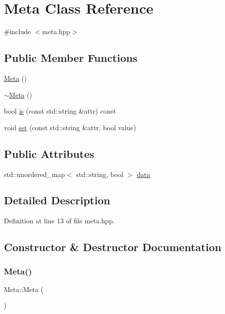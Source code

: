 \hypertarget{class_meta}{}\section{Meta Class Reference}
\label{class_meta}


{\ttfamily \#include $<$meta.\+hpp$>$}

\subsection*{Public Member Functions}
\begin{DoxyCompactItemize}
\item 
\hyperlink{class_meta_a19e6892526dc75960962404a9f7f215b}{Meta} ()
\item 
\hyperlink{class_meta_a6a2199955a1318b54f7d4d2a0e470b36}{$\sim$\+Meta} ()
\item 
bool \hyperlink{class_meta_a935668f7ea11c899be35505093a15415}{is} (const std\+::string \&attr) const
\item 
void \hyperlink{class_meta_a988be331a6084a39edafbeb7c5553ca5}{set} (const std\+::string \&attr, bool value)
\end{DoxyCompactItemize}
\subsection*{Public Attributes}
\begin{DoxyCompactItemize}
\item 
std\+::unordered\+\_\+map$<$ std\+::string, bool $>$ \hyperlink{class_meta_af865c7f4162188f51a5f8489dd556be8}{data}
\end{DoxyCompactItemize}


\subsection{Detailed Description}


Definition at line 13 of file meta.\+hpp.



\subsection{Constructor \& Destructor Documentation}
\mbox{\label{class_meta_a19e6892526dc75960962404a9f7f215b}} 
\subsubsection{\texorpdfstring{Meta()}{Meta()}}
{\footnotesize\ttfamily Meta\+::\+Meta (\begin{DoxyParamCaption}{ }\end{DoxyParamCaption})\hspace{0.3cm}{\ttfamily [inline]}}



